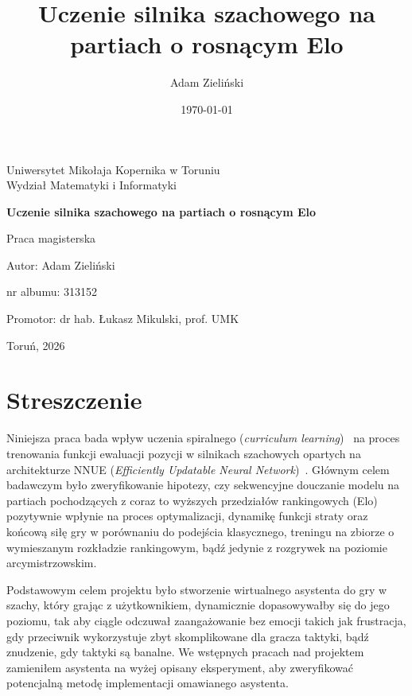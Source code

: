 \documentclass[12pt,a4paper]{report}
\title{Uczenie silnika szachowego na partiach o rosnącym Elo}
\author{Adam Zieliński}
\date{\today}
\begin{document}
\begin{titlepage}
    \centering
    \vspace*{1cm}
    {\Large Uniwersytet Mikołaja Kopernika w Toruniu\\ Wydział Matematyki i Informatyki \par}
    \vspace{3cm}
    {\Huge \textbf{Uczenie silnika szachowego na partiach o rosnącym Elo} \par}
    \vspace{2cm}
    {\Large Praca magisterska \par}
    \vspace{2cm}
    {\Large Autor: Adam Zieliński \par}
    {nr albumu: 313152 \par}
    {\Large Promotor: dr hab. Łukasz Mikulski, prof. UMK \par}
    \vfill
    {\Large Toruń, 2026 \par}
\end{titlepage}

\tableofcontents

\chapter*{Streszczenie}

Niniejsza praca bada wpływ uczenia spiralnego (\textit{curriculum learning})~\cite{bengio2009curriculum} na proces trenowania funkcji ewaluacji pozycji w silnikach szachowych opartych na architekturze NNUE (\textit{Efficiently Updatable Neural Network})~\cite{nasu2018efficiently}. Głównym celem badawczym było zweryfikowanie hipotezy, czy sekwencyjne douczanie modelu na partiach pochodzących z coraz to wyższych przedziałów rankingowych (Elo) pozytywnie wpłynie na proces optymalizacji, dynamikę funkcji straty oraz końcową siłę gry w porównaniu do podejścia klasycznego, treningu na zbiorze o wymieszanym rozkładzie rankingowym, bądź jedynie z rozgrywek na poziomie arcymistrzowskim.

Podstawowym celem projektu było stworzenie wirtualnego asystenta do gry w szachy, który grając z użytkownikiem, dynamicznie dopasowywałby się do jego poziomu, tak aby ciągle odczuwał zaangażowanie bez emocji takich jak frustracja, gdy przeciwnik wykorzystuje zbyt skomplikowane dla gracza taktyki, bądź znudzenie, gdy taktyki są banalne. We wstępnych pracach nad projektem zamieniłem asystenta na wyżej opisany eksperyment, aby zweryfikować potencjalną metodę implementacji omawianego asystenta.
\end{document}
